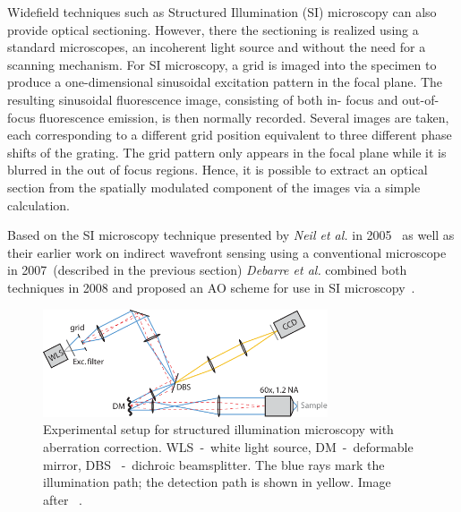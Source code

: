 Widefield techniques such as Structured Illumination (SI) microscopy can also provide optical sectioning. However, there the sectioning is realized using a standard microscopes, an incoherent light source and without the need for a scanning mechanism. For SI microscopy, a grid is imaged into the specimen to produce a one-dimensional sinusoidal excitation pattern in the focal plane. The resulting sinusoidal fluorescence image, consisting of both in- focus and out-of-focus fluorescence emission, is then normally recorded. Several images are taken, each corresponding to a different grid position equivalent to three different phase shifts of the grating. The grid pattern only appears in the focal plane while it is blurred in the out of focus regions. Hence, it is possible to extract an optical section from the spatially modulated component of the images via a simple calculation.

Based on the SI microscopy technique presented by \emph{Neil et al.} in 2005~\cite{wide_structured_illu_principle} as well as their earlier work on indirect wavefront sensing using a conventional microscope~\cite{wide_AOM_loew_freq} in 2007~(described in the previous section) \emph{Debarre et al.} combined both techniques in 2008 and proposed an AO scheme for use in SI microscopy~\cite{wide_AOM_structured_illu}.  

\begin{figure}[hbt]
	\centering
		\includegraphics[width=0.75\textwidth]{images/wide_structured_illumination.pdf}
	\caption{Experimental setup for structured illumination microscopy with 
aberration correction. WLS~-~white light source, DM~-~deformable mirror, DBS
~-~dichroic beamsplitter. The blue rays mark the illumination path; the 
detection path is shown in yellow. Image after~\cite{wide_AOM_structured_illu}
.}
	\label{fig:wide_structured_illumination}
\end{figure}

